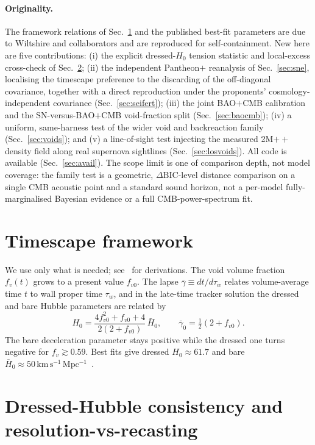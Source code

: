 \documentclass[aps,prd,twocolumn,nofootinbib,superscriptaddress,floatfix]{revtex4-2}
\newcommand{\Ho}{H_{0}}
\newcommand{\Hbaro}{\bar H_{0}}
\newcommand{\fvo}{f_{v0}}
\newcommand{\kmsmpc}{\,\mathrm{km\,s^{-1}\,Mpc^{-1}}}
\newcommand{\dBIC}{\Delta\mathrm{BIC}}
\begin{document}
\paragraph*{Originality.} The framework relations of Sec.~\ref{sec:framework}
and the published best-fit parameters are due to Wiltshire and collaborators and
are reproduced for self-containment. New here are five contributions: (i) the explicit
dressed-$\Ho$ tension statistic and local-excess cross-check of
Sec.~\ref{sec:consistency}; (ii) the independent Pantheon$+$ reanalysis of
Sec.~\ref{sec:sne}, localising the timescape preference to the discarding of the
off-diagonal covariance, together with a direct reproduction under the proponents'
cosmology-independent covariance (Sec.~\ref{sec:seifert}); (iii) the joint BAO$+$CMB
calibration and the SN-versus-BAO$+$CMB void-fraction split (Sec.~\ref{sec:baocmb});
(iv) a uniform, same-harness test of the wider void and backreaction family
(Sec.~\ref{sec:voids}); and (v) a line-of-sight test injecting the measured 2M$++$
density field along real supernova sightlines (Sec.~\ref{sec:losvoids}). All
code is available (Sec.~\ref{sec:avail}). The scope limit is one of comparison depth,
not model coverage: the family test is a geometric, $\dBIC$-level distance comparison on
a single CMB acoustic point and a standard sound horizon, not a per-model
fully-marginalised Bayesian evidence or a full CMB-power-spectrum fit.

\section{Timescape framework}
\label{sec:framework}

We use only what is needed; see~\cite{Wiltshire2007,Wiltshire2009} for
derivations. The void volume fraction $f_v(t)$ grows to a present value $\fvo$.
The lapse $\bar\gamma\equiv dt/d\tau_w$ relates volume-average time $t$ to wall
proper time $\tau_w$, and in the late-time tracker solution the dressed and bare
Hubble parameters are related by \cite[eqs.~(B7),(B9)]{Wiltshire2009}
\begin{equation}
\Ho=\frac{4\fvo^{2}+\fvo+4}{2(2+\fvo)}\,\Hbaro,\qquad
\bar\gamma_0=\tfrac12(2+\fvo).
\label{eq:dressed}
\end{equation}
The bare deceleration parameter stays positive while the dressed one turns
negative for $f_v\gtrsim0.59$. Best fits give dressed $\Ho\approx61.7$ and bare
$\Hbaro\approx50\kmsmpc$~\cite{Leith2008,Duley2013}.

\section{Dressed-Hubble consistency and resolution-vs-recasting}
\label{sec:consistency}
\end{document}
